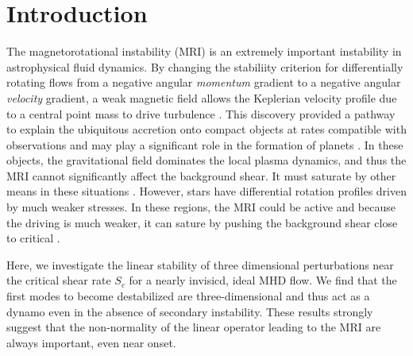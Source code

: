 \documentclass[aps,prl,reprint,superscriptaddress]{revtex4-1}
\begin{document}
\section{Introduction}
\label{sec:intro}
The magnetorotational instability (MRI) is an extremely important instability in astrophysical fluid dynamics.
By changing the stabiliity criterion for differentially rotating flows from a negative angular \emph{momentum} gradient to a negative angular \emph{velocity} gradient, a weak magnetic field allows the Keplerian velocity profile due to a central point mass to drive turbulence \citep[e.g.][]{1998RvMP...70....1B}.
This discovery provided a pathway to explain the ubiquitous accretion onto compact objects at rates compatible with observations and may play a significant role in the formation of planets \citep[e.g.][]{2007Natur.448.1022J}.
In these objects, the gravitational field dominates the local plasma dynamics, and thus the MRI cannot significantly affect the background shear.
It must saturate by other means in these situations \citep{2018MNRAS.474.3451X}.
However, stars have differential rotation profiles driven by much weaker stresses.
In these regions, the MRI could be active and because the driving is much weaker, it can sature by pushing the background shear close to critical \citep{2017ApJ...841....1C,2017ApJ...841....2C}.

Here, we investigate the linear stability of three dimensional perturbations near the critical shear rate $S_c$ for a nearly invisicd, ideal MHD flow.
We find that the first modes to become destabilized are three-dimensional and thus act as a dynamo even in the absence of secondary instability.
These results strongly suggest that the non-normality of the linear operator leading to the MRI are always important, even near onset.
\end{document}
